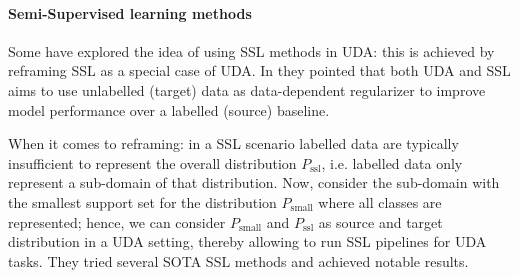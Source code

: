\paragraph{Semi-Supervised learning methods}
Some have explored the idea of using SSL methods in UDA: this is achieved by reframing SSL as a special case of UDA. In \cite[Zhang et al.]{Zhang2021} they pointed that both UDA and SSL aims to use unlabelled (target) data as data-dependent regularizer to improve model performance over a labelled (source) baseline. 

When it comes to reframing: in a SSL scenario labelled data are typically insufficient to represent the overall distribution \(P_{\textrm{ssl}}\), i.e. labelled data only represent a sub-domain of that distribution. Now, consider the sub-domain with the smallest support set for the distribution \(P_{\textrm{small}}\) where all classes are represented; hence, we can consider \(P_{\textrm{small}}\) and \(P_{\textrm{ssl}}\) as source and target distribution in a UDA setting, thereby allowing to run SSL pipelines for UDA tasks. They tried several SOTA SSL methods and achieved notable results.